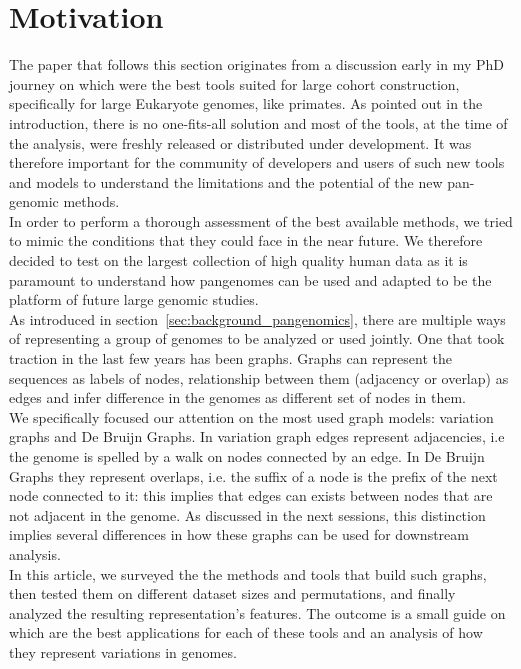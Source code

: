 \section{Motivation}
The paper that follows this section originates from a discussion early in my PhD journey on which were the best tools suited for large cohort \pangenome construction, specifically for large 
Eukaryote genomes, like primates. As pointed out in the introduction, there is no one-fits-all solution and most of the tools, at the time of the analysis, were freshly released or distributed under development. It was therefore important for the community of developers and users of such new tools and models to understand the limitations and the potential of the new pan-genomic methods.\\
In order to perform a thorough assessment of the best available methods, we tried to mimic the conditions that they could face in the near future. We therefore decided to test on the largest collection of high quality human data as it is paramount to understand how pangenomes can be used and adapted to be the platform of future large genomic studies.\\
As introduced in section~\ref{sec:background_pangenomics}, there are multiple ways of representing a group of genomes to be analyzed or used jointly. One that took traction in the last few years has been graphs. Graphs can represent the sequences as labels of nodes, relationship between them (adjacency or overlap) as edges and infer difference in the genomes as different set of nodes in them.\\
We specifically focused our attention on the most used graph models: variation graphs and De Bruijn Graphs. In variation graph edges represent adjacencies, i.e the genome is spelled by a walk on nodes connected by an edge. In De Bruijn Graphs they represent overlaps, i.e. the suffix of a node is the prefix of the next node connected to it: this implies that edges can exists between nodes that are not adjacent in the genome. As discussed in the next sessions, this distinction implies several differences in how these graphs can be used for downstream analysis. \\ 
In this article, we surveyed the the methods and tools that build such graphs, then tested them on different dataset sizes and permutations, and finally analyzed the resulting representation's features. The outcome is a small guide on which are the best applications for each of these tools and an analysis of how they represent variations in genomes. \\

